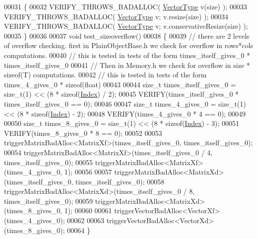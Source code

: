 \begin{DoxyCode}
00031 \{
00032   VERIFY\_THROWS\_BADALLOC( \hyperlink{struct_vector_type}{VectorType} v(size) );
00033   VERIFY\_THROWS\_BADALLOC( \hyperlink{struct_vector_type}{VectorType} v; v.resize(size) );
00034   VERIFY\_THROWS\_BADALLOC( \hyperlink{struct_vector_type}{VectorType} v; v.conservativeResize(size) );
00035 \}
00036 
00037 \textcolor{keywordtype}{void} test\_sizeoverflow()
00038 \{
00039   \textcolor{comment}{// there are 2 levels of overflow checking. first in PlainObjectBase.h we check for overflow in rows*cols
       computations.}
00040   \textcolor{comment}{// this is tested in tests of the form times\_itself\_gives\_0 * times\_itself\_gives\_0}
00041   \textcolor{comment}{// Then in Memory.h we check for overflow in size * sizeof(T) computations.}
00042   \textcolor{comment}{// this is tested in tests of the form times\_4\_gives\_0 * sizeof(float)}
00043   
00044   \textcolor{keywordtype}{size\_t} times\_itself\_gives\_0 = size\_t(1) << (8 * \textcolor{keyword}{sizeof}(\hyperlink{namespace_eigen_a62e77e0933482dafde8fe197d9a2cfde}{Index}) / 2);
00045   VERIFY(times\_itself\_gives\_0 * times\_itself\_gives\_0 == 0);
00046 
00047   \textcolor{keywordtype}{size\_t} times\_4\_gives\_0 = size\_t(1) << (8 * \textcolor{keyword}{sizeof}(\hyperlink{namespace_eigen_a62e77e0933482dafde8fe197d9a2cfde}{Index}) - 2);
00048   VERIFY(times\_4\_gives\_0 * 4 == 0);
00049 
00050   \textcolor{keywordtype}{size\_t} times\_8\_gives\_0 = size\_t(1) << (8 * \textcolor{keyword}{sizeof}(\hyperlink{namespace_eigen_a62e77e0933482dafde8fe197d9a2cfde}{Index}) - 3);
00051   VERIFY(times\_8\_gives\_0 * 8 == 0);
00052 
00053   triggerMatrixBadAlloc<MatrixXf>(times\_itself\_gives\_0, times\_itself\_gives\_0);
00054   triggerMatrixBadAlloc<MatrixXf>(times\_itself\_gives\_0 / 4, times\_itself\_gives\_0);
00055   triggerMatrixBadAlloc<MatrixXf>(times\_4\_gives\_0, 1);
00056 
00057   triggerMatrixBadAlloc<MatrixXd>(times\_itself\_gives\_0, times\_itself\_gives\_0);
00058   triggerMatrixBadAlloc<MatrixXd>(times\_itself\_gives\_0 / 8, times\_itself\_gives\_0);
00059   triggerMatrixBadAlloc<MatrixXd>(times\_8\_gives\_0, 1);
00060   
00061   triggerVectorBadAlloc<VectorXf>(times\_4\_gives\_0);
00062   
00063   triggerVectorBadAlloc<VectorXd>(times\_8\_gives\_0);
00064 \}
\end{DoxyCode}
